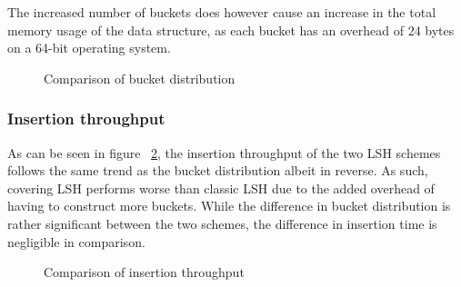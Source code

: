 The increased number of buckets does however cause an increase in the total memory usage of the data structure, as each bucket has an overhead of 24 bytes on a 64-bit operating system.

\begin{figure}[ht]
  \centering

  \caption{Comparison of bucket distribution}
  \label{fig:buckets-per-partition}
\end{figure}

\subsubsection{Insertion throughput}

As can be seen in figure ~\ref{fig:insertions-per-second}, the insertion throughput of the two LSH schemes follows the same trend as the bucket distribution albeit in reverse. As such, covering LSH performs worse than classic LSH due to the added overhead of having to construct more buckets. While the difference in bucket distribution is rather significant between the two schemes, the difference in insertion time is negligible in comparison.

\begin{figure}[ht]
  \centering

  \caption{Comparison of insertion throughput}
  \label{fig:insertions-per-second}
\end{figure}

